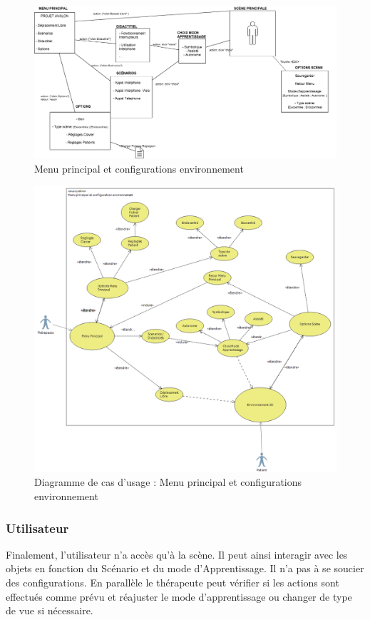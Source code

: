 \begin{figure}[h]
\centering
\includegraphics[width=1\textwidth]{2-Specifications/img-utilisateur/menu.png}
\caption{\label{fig:Menu} Menu principal et configurations environnement }
\end{figure}
\begin{figure}[h]
\centering
\includegraphics[width=1\textwidth]{2-Specifications/img-utilisateur/cas-usage-menu.png}
\caption{\label{fig:CasUsageMenu} Diagramme de cas d'usage : Menu principal et configurations environnement }
\end{figure}
\FloatBarrier 


\subsubsection{Utilisateur}
Finalement, l'utilisateur n'a accès qu'à la scène. Il peut ainsi interagir avec les objets en fonction du Scénario et du mode d'Apprentissage. Il n'a pas à se soucier des configurations. En parallèle le thérapeute peut vérifier si les actions sont effectués comme prévu et réajuster le mode d'apprentissage ou changer de type de vue si nécessaire.
